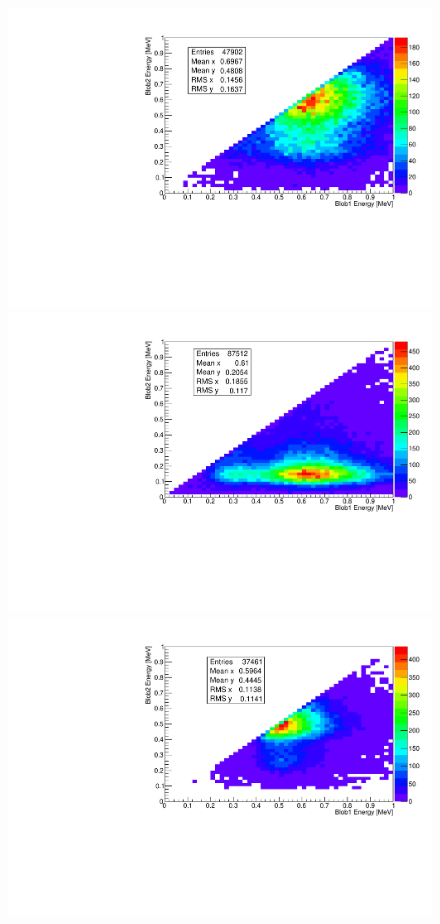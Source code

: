 \documentclass[a4paper,11pt]{article}
\begin{document}
\begin{figure}[!htb]
	\centering
	\includegraphics[scale = 0.35]{fig/blob1vsblob2_Paolina10105_0vbb.pdf}
	\includegraphics[scale = 0.35]{fig/blob1vsblob2_Paolina10105_Bi214.pdf}	
	\includegraphics[scale = 0.35]{fig/blob1vsblob2_Paolina222_0vbb.pdf}

\end{figure}
\end{document}
